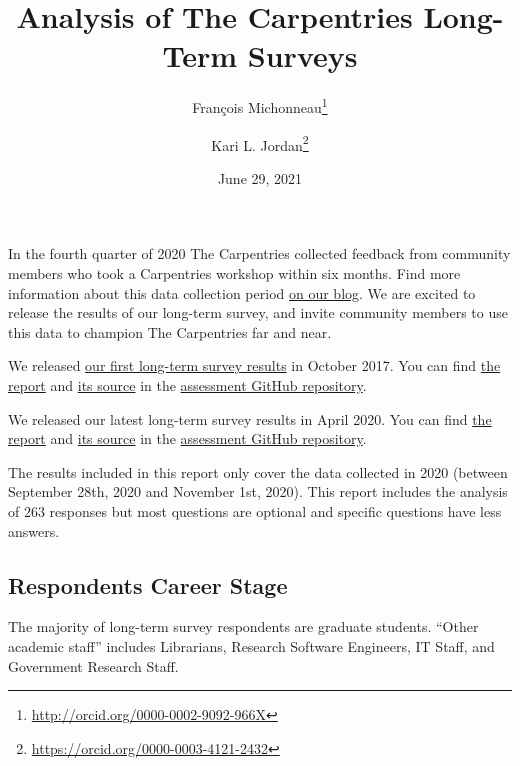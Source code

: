 \documentclass[
]{article}
\title{Analysis of The Carpentries Long-Term Surveys}
\author{François Michonneau\footnote{\url{http://orcid.org/0000-0002-9092-966X}} \and Kari
L. Jordan\footnote{\url{https://orcid.org/0000-0003-4121-2432}}}
\date{June 29, 2021}
\begin{document}
\maketitle

{
\setcounter{tocdepth}{2}
\tableofcontents
}
In the fourth quarter of 2020 The Carpentries collected feedback from
community members who took a Carpentries workshop within six months.
Find more information about this data collection period
\href{https://carpentries.org/blog/2020/09/long-term-survey-is-now-open/}{on
our blog}. We are excited to release the results of our long-term
survey, and invite community members to use this data to champion The
Carpentries far and near.

We released
\href{https://datacarpentry.org/blog/2017/10/long-term-survey-results}{our
first long-term survey results} in October 2017. You can find
\href{https://github.com/carpentries/assessment/blob/master/learner-assessment/archives/2017/reports/longtermreport_October2017.pdf}{the
report} and
\href{https://github.com/carpentries/assessment/blob/master/learner-assessment/archives/2017/code/longtermreport_October2017.rmd}{its
source} in the
\href{https://github.com/carpentries/assessment/blob/master/learner-assessment/}{assessment
GitHub repository}.

We released our latest long-term survey results in April 2020. You can
find
\href{https://github.com/carpentries/assessment/blob/master/learner-assessment/reports/2020-01-long-term-report.pdf}{the
report} and
\href{https://github.com/carpentries/assessment/blob/master/learner-assessment/reports-src/2020-01-long-term-survey.Rmd}{its
source} in the
\href{https://github.com/carpentries/assessment/blob/master/learner-assessment/}{assessment
GitHub repository}.

The results included in this report only cover the data collected in
2020 (between September 28th, 2020 and November 1st, 2020). This report
includes the analysis of 263 responses but most questions are optional
and specific questions have less answers.

\hypertarget{respondents-career-stage}{%
\subsection{Respondents Career Stage}\label{respondents-career-stage}}

The majority of long-term survey respondents are graduate students.
``Other academic staff'' includes Librarians, Research Software
Engineers, IT Staff, and Government Research Staff.
\end{document}
